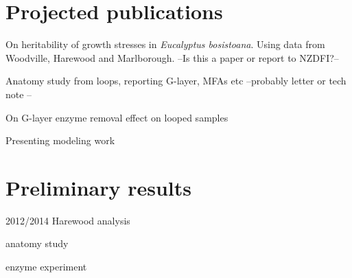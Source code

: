 \documentclass{article}
\begin{document}
\section{Projected publications}
On heritability of growth stresses in \textit{Eucalyptus bosistoana}. Using data
from Woodville, Harewood and Marlborough. --Is this a paper or report to NZDFI?--

Anatomy study from loops, reporting G-layer, MFAs etc --probably letter or tech
note --

On G-layer enzyme removal effect on looped samples

Presenting modeling work

\section{Preliminary results}
2012/2014 Harewood analysis

anatomy study

enzyme experiment
\end{document}
